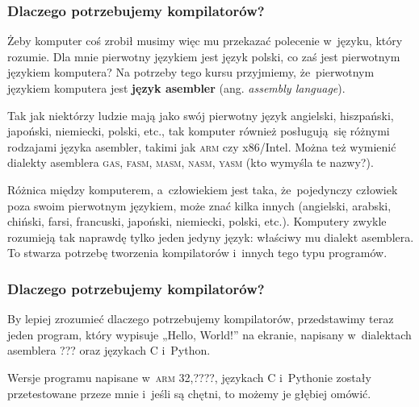 \documentclass[10pt,t]{beamer}
\begin{document}
\begin{frame}
  \frametitle{Dlaczego potrzebujemy kompilatorów?}

  \pause


  Żeby komputer coś zrobił musimy więc mu przekazać polecenie w~języku,
  który rozumie. Dla mnie pierwotny językiem jest język polski, co zaś
  jest pierwotnym językiem komputera? Na potrzeby tego kursu przyjmiemy,
  że~pierwotnym językiem komputera jest \textbf{język asembler}
  (ang. \textit{assembly language}).

  Tak jak niektórzy ludzie mają jako swój pierwotny język angielski,
  hiszpański, japoński, niemiecki, polski, etc., tak komputer również
  posługują~się różnymi rodzajami języka asembler, takimi jak \textsc{arm}
  czy x86/Intel. Można też wymienić dialekty asemblera \textsc{gas},
  \textsc{fasm}, \textsc{masm}, \textsc{nasm}, \textsc{yasm} (kto wymyśla
  te nazwy?).

  Różnica między komputerem, a~człowiekiem jest taka, że~pojedynczy człowiek
  poza swoim pierwotnym językiem, może znać kilka innych (angielski,
  arabski, chiński, farsi, francuski, japoński, niemiecki, polski, etc.).
  Komputery zwykle rozumieją tak naprawdę tylko \alert{jeden jedyny}
  język: właściwy mu dialekt asemblera. To stwarza potrzebę tworzenia
  kompilatorów i~innych tego typu programów.





\end{frame}





\begin{frame}
  \frametitle{Dlaczego potrzebujemy kompilatorów?}


  By lepiej zrozumieć dlaczego potrzebujemy kompilatorów, przedstawimy
  teraz jeden program, który wypisuje „Hello, World!” na ekranie, napisany
  w~dialektach asemblera ??? oraz językach C i~Python.

  Wersje programu napisane w~\textsc{arm} 32,????, językach C i~Pythonie
  zostały przetestowane przeze mnie i~jeśli są chętni, to możemy je głębiej
  omówić.

\end{frame}
\end{document}
